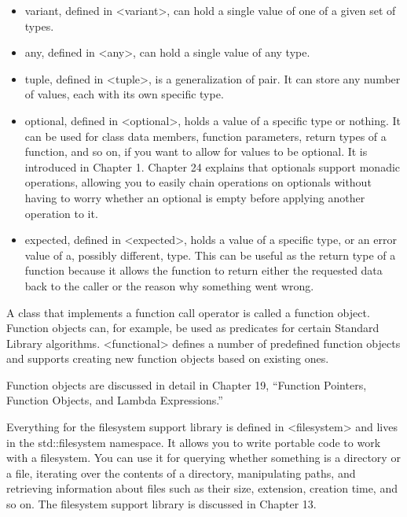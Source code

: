 \begin{itemize}
\item
variant, defined in <variant>, can hold a single value of one of a given set of types.

\item
any, defined in <any>, can hold a single value of any type.

\item
tuple, defined in <tuple>, is a generalization of pair. It can store any number of values, each with its own specific type.

\item
optional, defined in <optional>, holds a value of a specific type or nothing. It can be used for class data members, function parameters, return types of a function, and so on, if you want to allow for values to be optional. It is introduced in Chapter 1. Chapter 24 explains that optionals support monadic operations, allowing you to easily chain operations on optionals without having to worry whether an optional is empty before applying another operation to it.

\item
expected, defined in <expected>, holds a value of a specific type, or an error value of a, possibly different, type. This can be useful as the return type of a function because it allows the function to return either the requested data back to the caller or the reason why something went wrong.
\end{itemize}



A class that implements a function call operator is called a function object. Function objects can, for example, be used as predicates for certain Standard Library algorithms. <functional> defines a number of predefined function objects and supports creating new function objects based on existing ones.

Function objects are discussed in detail in Chapter 19, “Function Pointers, Function Objects, and Lambda Expressions.”


Everything for the filesystem support library is defined in <filesystem> and lives in the std::filesystem namespace. It allows you to write portable code to work with a filesystem. You can use it for querying whether something is a directory or a file, iterating over the contents of a directory, manipulating paths, and retrieving information about files such as their size, extension, creation time, and so on. The filesystem support library is discussed in Chapter 13.

